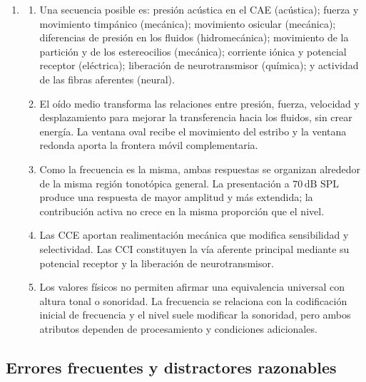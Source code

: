 \begin{enumerate}[label=\textbf{P\arabic*.},leftmargin=*]
    \item
    \begin{enumerate}[label=\alph*)]
        \item Una secuencia posible es: presión acústica en el CAE
        (acústica); fuerza y movimiento timpánico (mecánica); movimiento
        osicular (mecánica); diferencias de presión en los fluidos
        (hidromecánica); movimiento de la partición y de los estereocilios
        (mecánica); corriente iónica y potencial receptor (eléctrica);
        liberación de neurotransmisor (química); y actividad de las fibras
        aferentes (neural).

        \item El oído medio transforma las relaciones entre presión, fuerza,
        velocidad y desplazamiento para mejorar la transferencia hacia los
        fluidos, sin crear energía. La ventana oval recibe el movimiento del
        estribo y la ventana redonda aporta la frontera móvil complementaria.

        \item Como la frecuencia es la misma, ambas respuestas se organizan
        alrededor de la misma región tonotópica general. La presentación a
        \(70\,\text{dB SPL}\) produce una respuesta de mayor amplitud y más
        extendida; la contribución activa no crece en la misma proporción que
        el nivel.

        \item Las CCE aportan realimentación mecánica que modifica
        sensibilidad y selectividad. Las CCI constituyen la vía aferente
        principal mediante su potencial receptor y la liberación de
        neurotransmisor.

        \item Los valores físicos no permiten afirmar una equivalencia
        universal con altura tonal o sonoridad. La frecuencia se relaciona
        con la codificación inicial de frecuencia y el nivel suele modificar
        la sonoridad, pero ambos atributos dependen de procesamiento y
        condiciones adicionales.
    \end{enumerate}
\end{enumerate}

\subsection*{Errores frecuentes y distractores razonables}

